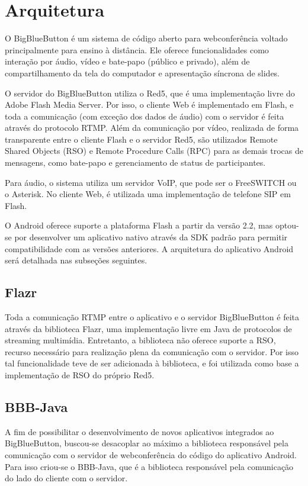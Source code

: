 \documentclass{acm_proc_article-sp}
\begin{document}
\section{Arquitetura}

O BigBlueButton é um sistema de código aberto para webconferência voltado principalmente para ensino à distância. Ele oferece funcionalidades como interação por áudio, vídeo e bate-papo (público e privado), além de compartilhamento da tela do computador e apresentação síncrona de slides.

O servidor do BigBlueButton utiliza o Red5, que é uma implementação livre do Adobe Flash Media Server. Por isso, o cliente Web é implementado em Flash, e toda a comunicação (com exceção dos dados de áudio) com o servidor é feita através do protocolo RTMP. Além da comunicação por vídeo, realizada de forma transparente entre o cliente Flash e o servidor Red5, são utilizados Remote Shared Objects (RSO) e Remote Procedure Calls (RPC) para as demais trocas de mensagens, como bate-papo e gerenciamento de status de participantes.

Para áudio, o sistema utiliza um servidor VoIP, que pode ser o FreeSWITCH ou o Asterisk. No cliente Web, é utilizada uma implementação de telefone SIP em Flash.

O Android oferece suporte a plataforma Flash a partir da versão 2.2, mas optou-se por desenvolver um aplicativo nativo através da SDK padrão para permitir compatibilidade com as versões anteriores. A arquitetura do aplicativo Android será detalhada nas subseções seguintes.

\subsection{Flazr}

Toda a comunicação RTMP entre o aplicativo e o servidor BigBlueButton é feita através da biblioteca Flazr, uma implementação livre em Java de protocolos de streaming multimídia. Entretanto, a biblioteca não oferece suporte a RSO, recurso necessário para realização plena da comunicação com o servidor. Por isso tal funcionalidade teve de ser adicionada à biblioteca, e foi utilizada como base a implementação de RSO do próprio Red5.

\subsection{BBB-Java}

A fim de possibilitar o desenvolvimento de novos aplicativos integrados ao BigBlueButton, buscou-se desacoplar ao máximo a biblioteca responsável pela comunicação com o servidor de webconferência do código do aplicativo Android. Para isso criou-se o BBB-Java, que é a biblioteca responsável pela comunicação do lado do cliente com o servidor.
\end{document}
